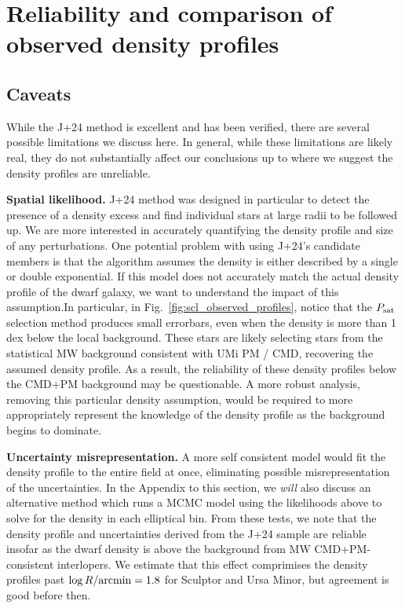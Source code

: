 \section{Reliability and comparison of observed density
profiles}\label{reliability-and-comparison-of-observed-density-profiles}

\subsection{Caveats}\label{caveats}

While the J+24 method is excellent and has been verified, there are
several possible limitations we discuss here. In general, while these
limitations are likely real, they do not substantially affect our
conclusions up to where we suggest the density profiles are unreliable.

\textbf{Spatial likelihood.} J+24 method was designed in particular to
detect the presence of a density excess and find individual stars at
large radii to be followed up. We are more interested in accurately
quantifying the density profile and size of any perturbations. One
potential problem with using J+24's candidate members is that the
algorithm assumes the density is either described by a single or double
exponential. If this model does not accurately match the actual density
profile of the dwarf galaxy, we want to understand the impact of this
assumption.In particular, in Fig.~\ref{fig:scl_observed_profiles},
notice that the \(P_{\rm sat}\) selection method produces small
errorbars, even when the density is more than 1 dex below the local
background. These stars are likely selecting stars from the statistical
MW background consistent with UMi PM / CMD, recovering the assumed
density profile. As a result, the reliability of these density profiles
below the CMD+PM background may be questionable. A more robust analysis,
removing this particular density assumption, would be required to more
appropriately represent the knowledge of the density profile as the
background begins to dominate.

\textbf{Uncertainty misrepresentation.} A more self consistent model
would fit the density profile to the entire field at once, eliminating
possible misrepresentation of the uncertainties. In the Appendix to this
section, we \emph{will} also discuss an alternative method which runs a
MCMC model using the likelihoods above to solve for the density in each
elliptical bin. From these tests, we note that the density profile and
uncertainties derived from the J+24 sample are reliable insofar as the
dwarf density is above the background from MW CMD+PM-consistent
interlopers. We estimate that this effect comprimises the density
profiles past \(\log R / {\rm arcmin} = 1.8\) for Sculptor and Ursa
Minor, but agreement is good before then.

